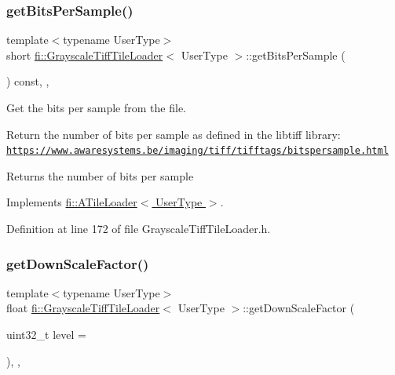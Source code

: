 \subsubsection{\texorpdfstring{get\+Bits\+Per\+Sample()}{getBitsPerSample()}}
{\footnotesize\ttfamily template$<$typename User\+Type$>$ \\
short \hyperlink{classfi_1_1GrayscaleTiffTileLoader}{fi\+::\+Grayscale\+Tiff\+Tile\+Loader}$<$ User\+Type $>$\+::get\+Bits\+Per\+Sample (\begin{DoxyParamCaption}{ }\end{DoxyParamCaption}) const\hspace{0.3cm}{\ttfamily [inline]}, {\ttfamily [override]}, {\ttfamily [virtual]}}



Get the bits per sample from the file. 

Return the number of bits per sample as defined in the libtiff library\+: \href{https://www.awaresystems.be/imaging/tiff/tifftags/bitspersample.html}{\tt https\+://www.\+awaresystems.\+be/imaging/tiff/tifftags/bitspersample.\+html} \begin{DoxyReturn}{Returns}
the number of bits per sample 
\end{DoxyReturn}


Implements \hyperlink{classfi_1_1ATileLoader_a20ce7ee013801a64dedc95c2a3b9be7f}{fi\+::\+A\+Tile\+Loader$<$ User\+Type $>$}.



Definition at line 172 of file Grayscale\+Tiff\+Tile\+Loader.\+h.

\mbox{\label{classfi_1_1GrayscaleTiffTileLoader_a30200666aa71f80ea0fa9e035519635b}} 
\subsubsection{\texorpdfstring{get\+Down\+Scale\+Factor()}{getDownScaleFactor()}}
{\footnotesize\ttfamily template$<$typename User\+Type$>$ \\
float \hyperlink{classfi_1_1GrayscaleTiffTileLoader}{fi\+::\+Grayscale\+Tiff\+Tile\+Loader}$<$ User\+Type $>$\+::get\+Down\+Scale\+Factor (\begin{DoxyParamCaption}\item[{uint32\+\_\+t}]{level = {} }\end{DoxyParamCaption})\hspace{0.3cm}{\ttfamily [inline]}, {\ttfamily [override]}, {\ttfamily [virtual]}}



